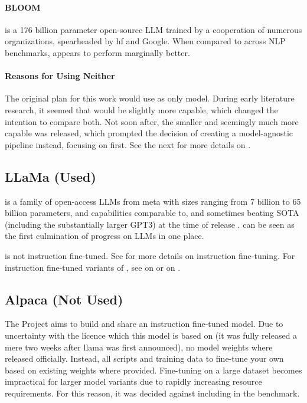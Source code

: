 \paragraph{BLOOM}\label{par:bloom}\label{sub:BLOOM}
 \cite{workshop_bloom_2022} is a 176 billion parameter open-source \gls{LLM} trained by a cooperation of numerous organizations, spearheaded by \gls{hf} and \gls{Google}. When compared to  across \gls{NLP} benchmarks,  appears to perform marginally better.

\paragraph{Reasons for Using Neither}
The original plan for this work would use  as only model. During early literature research, it seemed that  would be slightly more capable, which changed the intention to compare both.
Not soon after, the smaller and seemingly much more capable  was released, which prompted the decision of creating a model-agnostic pipeline instead, focusing on  first.
See the next  for more details on .

\subsection{LLaMa (Used)}\label{sub:llama}
 is a family of open-access \glspl{LLM} from \gls{meta} with sizes ranging from 7 billion to 65 billion parameters, and capabilities comparable to, and sometimes beating \gls{SOTA} (including the substantially larger \gls{GPT3}) at the time of release \cite{touvron_llama_2023}.
 can be seen as the first culmination of progress on \glspl{LLM} in one place.

 is not instruction fine-tuned. See  for more details on instruction fine-tuning.
For instruction fine-tuned variants of , see  on  or  on .

\subsection{Alpaca (Not Used)}\label{sub:alpaca}
The  Project \cite{tatsulab_2023} aims to build and share an instruction fine-tuned  model.
Due to uncertainty with the  licence which this model is based on (it was fully released a mere two weeks after \gls{llama} was first announced), no model weights where released officially.
Instead, all scripts and training data to fine-tune your own  based on existing  weights where provided. 
Fine-tuning on a large dataset becomes impractical for larger model variants due to rapidly increasing resource requirements.
For this reason, it was decided against including  in the benchmark.


